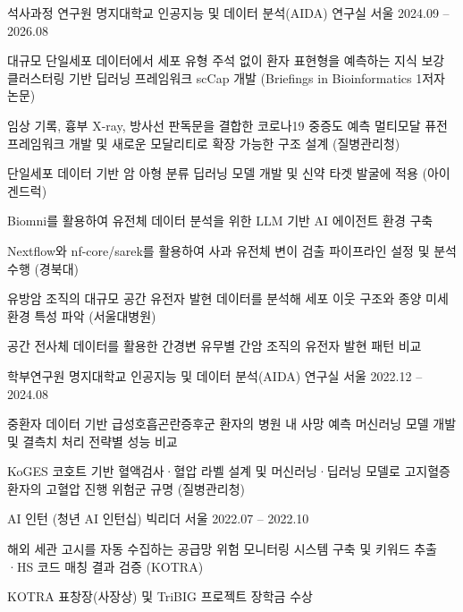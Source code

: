 \documentclass[11pt, a4paper]{awesome-cv}
\let\origcvsection\cvsection
\renewcommand{\cvsection}[1]{\needspace{7\baselineskip}\origcvsection{#1}}
\begin{document}
\vspace{-3.5mm}


\begin{cventries}
\cventry
    {석사과정 연구원} %
    {명지대학교 인공지능 및 데이터 분석(AIDA) 연구실} %
    {서울} %
    {2024.09 -- 2026.08} %
    {
      \begin{cvitems}
        \item {대규모 단일세포 데이터에서 세포 유형 주석 없이 환자 표현형을 예측하는 지식 보강 클러스터링 기반 딥러닝 프레임워크 scCap 개발 (Briefings in Bioinformatics 1저자 논문)}
        \item {임상 기록, 흉부 X-ray, 방사선 판독문을 결합한 코로나19 중증도 예측 멀티모달 퓨전 프레임워크 개발 및 새로운 모달리티로 확장 가능한 구조 설계 (질병관리청)}
        \item {단일세포 데이터 기반 암 아형 분류 딥러닝 모델 개발 및 신약 타겟 발굴에 적용 (아이겐드럭)}
        \item {Biomni를 활용하여 유전체 데이터 분석을 위한 LLM 기반 AI 에이전트 환경 구축}
        \item {Nextflow와 nf-core/sarek를 활용하여 사과 유전체 변이 검출 파이프라인 설정 및 분석 수행 (경북대)}
        \item {유방암 조직의 대규모 공간 유전자 발현 데이터를 분석해 세포 이웃 구조와 종양 미세환경 특성 파악 (서울대병원)}
        \item {공간 전사체 데이터를 활용한 간경변 유무별 간암 조직의 유전자 발현 패턴 비교}
      \end{cvitems}
    }
\vspace{-1mm}
\cventry
    {학부연구원} %
    {명지대학교 인공지능 및 데이터 분석(AIDA) 연구실} %
    {서울} %
    {2022.12 -- 2024.08} %
    {
      \begin{cvitems}
        \item {중환자 데이터 기반 급성호흡곤란증후군 환자의 병원 내 사망 예측 머신러닝 모델 개발 및 결측치 처리 전략별 성능 비교}
        \item {KoGES 코호트 기반 혈액검사·혈압 라벨 설계 및 머신러닝·딥러닝 모델로 고지혈증 환자의 고혈압 진행 위험군 규명 (질병관리청)}
      \end{cvitems}
    }
\vspace{-1mm}
\cventry
    {AI 인턴 (청년 AI 인턴십)}
    {빅리더}
    {서울}
    {2022.07 -- 2022.10}
    {
      \begin{cvitems}
        \item {해외 세관 고시를 자동 수집하는 공급망 위험 모니터링 시스템 구축 및 키워드 추출·HS 코드 매칭 결과 검증 (KOTRA)}
        \item {KOTRA 표창장(사장상) 및 TriBIG 프로젝트 장학금 수상}
      \end{cvitems}
    }
\end{cventries}
\end{document}
